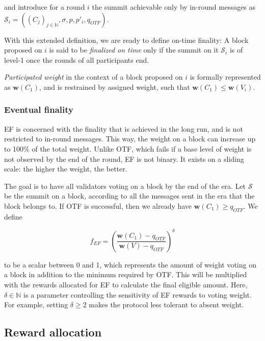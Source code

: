 \documentclass[12pt]{article}
\begin{document}
and introduce for a round $i$ the summit achievable only by in-round messages as $\mathcal{S}_i=((C_j)_{j\in\mathbb{N}}, \sigma,p,p'_{i},q_{OTF})$.

With this extended definition, we are ready to define on-time finality: A block proposed on $i$ is said to be \emph{finalized on time} only if the summit on it $\mathcal{S}_i$ is of level-1 once the rounds of all participants end.

\emph{Participated weight} in the context of a block proposed on $i$ is formally represented as $\boldsymbol{w}(C_1)$, and is restrained by assigned weight, such that $\boldsymbol{w}(C_1) \leq \boldsymbol{w}(V_i)$.

\subsubsection*{Eventual finality}
\label{eventual-finality}

EF is concerned with the finality that is achieved in the long run, and is not restricted to in-round messages. This way, the weight on a block can increase up to 100\% of the total weight. Unlike OTF, which fails if a base level of weight is not observed by the end of the round, EF is not binary. It exists on a sliding scale: the higher the weight, the better.

The goal is to have all validators voting on a block by the end of the era. Let $\mathcal{S}$ be the summit on a block, according to all the messages sent in the era that the block belongs to. If OTF is successful, then we already have $\boldsymbol{w}(C_1)\geq q_{OTF}$. We define

\begin{equation}
f_{EF} = \left(\frac{\boldsymbol{w}(C_1) - q_{OTF}}{\boldsymbol{w}(V)-q_{OTF}}\right)^\delta
\end{equation}

to be a scalar between 0 and 1, which represents the amount of weight voting on a block in addition to the minimum required by OTF. This will be multiplied with the rewards allocated for EF to calculate the final eligible amount. Here, $\delta \in \mathbb{N}$ is a parameter controlling the sensitivity of EF rewards to voting weight. For example, setting $\delta \geq 2$ makes the protocol less tolerant to absent weight.

\subsection{Reward allocation}
\label{reward-allocation}
\end{document}
